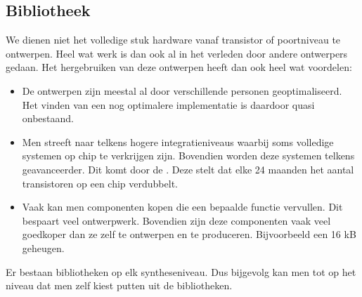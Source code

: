 \subsection{Bibliotheek}
\label{ss:bibliotheek}
We dienen niet het volledige stuk hardware vanaf transistor of poortniveau te ontwerpen. Heel wat werk is dan ook al in het verleden door andere ontwerpers gedaan. Het hergebruiken van deze ontwerpen heeft dan ook heel wat voordelen:
\begin{itemize}
 \item De ontwerpen zijn meestal al door verschillende personen geoptimaliseerd. Het vinden van een nog optimalere implementatie is daardoor quasi onbestaand.
 \item Men streeft naar telkens hogere integratieniveaus waarbij soms volledige systemen op chip te verkrijgen zijn. Bovendien worden deze systemen telkens geavanceerder. Dit komt door de . Deze stelt dat elke 24 maanden het aantal transistoren op een chip verdubbelt.
 \item Vaak kan men componenten kopen die een bepaalde functie vervullen. Dit bespaart veel ontwerpwerk. Bovendien zijn deze componenten vaak veel goedkoper dan ze zelf te ontwerpen en te produceren. Bijvoorbeeld een 16 kB geheugen.
\end{itemize}
Er bestaan bibliotheken op elk syntheseniveau. Dus bijgevolg kan men tot op het niveau dat men zelf kiest putten uit de bibliotheken.
